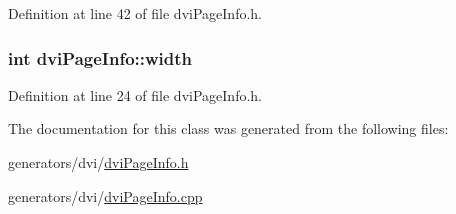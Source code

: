 Definition at line 42 of file dvi\+Page\+Info.\+h.

\hypertarget{classdviPageInfo_ae69134192cb1f4a18c3eb8e52e52be73}{
\subsubsection[{width}]{\setlength{\rightskip}{0pt plus 5cm}int dvi\+Page\+Info\+::width}}\label{classdviPageInfo_ae69134192cb1f4a18c3eb8e52e52be73}


Definition at line 24 of file dvi\+Page\+Info.\+h.



The documentation for this class was generated from the following files\+:\begin{DoxyCompactItemize}
\item 
generators/dvi/\hyperlink{dviPageInfo_8h}{dvi\+Page\+Info.\+h}\item 
generators/dvi/\hyperlink{dviPageInfo_8cpp}{dvi\+Page\+Info.\+cpp}\end{DoxyCompactItemize}
